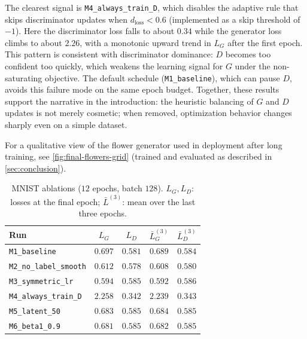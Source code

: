 \documentclass{article}
\theoremstyle{plain}
\theoremstyle{definition}
\theoremstyle{remark}
\begin{document}
The clearest signal is \texttt{M4\_always\_train\_D}, which disables the adaptive rule that skips discriminator updates when $d_{\mathrm{loss}}<0.6$ (implemented as a skip threshold of $-1$). Here the discriminator loss falls to about $0.34$ while the generator loss climbs to about $2.26$, with a monotonic upward trend in $L_G$ after the first epoch. This pattern is consistent with discriminator dominance: $D$ becomes too confident too quickly, which weakens the learning signal for $G$ under the non-saturating objective. The default schedule (\texttt{M1\_baseline}), which can pause $D$, avoids this failure mode on the same epoch budget. Together, these results support the narrative in the introduction: the heuristic balancing of $G$ and $D$ updates is not merely cosmetic; when removed, optimization behavior changes sharply even on a simple dataset.

For a qualitative view of the flower generator used in deployment after long training, see \cref{fig:final-flowers-grid} (trained and evaluated as described in \cref{sec:conclusion}).

\begin{table}[t]
\caption{MNIST ablations ($12$ epochs, batch $128$). $L_G,L_D$: losses at the final epoch; $\bar{L}^{(3)}$: mean over the last three epochs.}
\label{tab:mnist-ablations}
\vskip 0.1in
\begin{center}
\begin{small}
\begin{sc}
\begin{tabular}{lcccc}
\toprule
Run & $L_G$ & $L_D$ & $\bar{L}_G^{(3)}$ & $\bar{L}_D^{(3)}$ \\
\midrule
\texttt{M1\_baseline} & $0.697$ & $0.581$ & $0.689$ & $0.584$ \\
\texttt{M2\_no\_label\_smooth} & $0.612$ & $0.578$ & $0.608$ & $0.580$ \\
\texttt{M3\_symmetric\_lr} & $0.594$ & $0.585$ & $0.592$ & $0.586$ \\
\texttt{M4\_always\_train\_D} & $2.258$ & $0.342$ & $2.239$ & $0.343$ \\
\texttt{M5\_latent\_50} & $0.683$ & $0.585$ & $0.684$ & $0.585$ \\
\texttt{M6\_beta1\_0.9} & $0.681$ & $0.585$ & $0.682$ & $0.585$ \\
\bottomrule
\end{tabular}
\end{sc}
\end{small}
\end{center}
\vskip -0.25in
\end{table}
\end{document}
